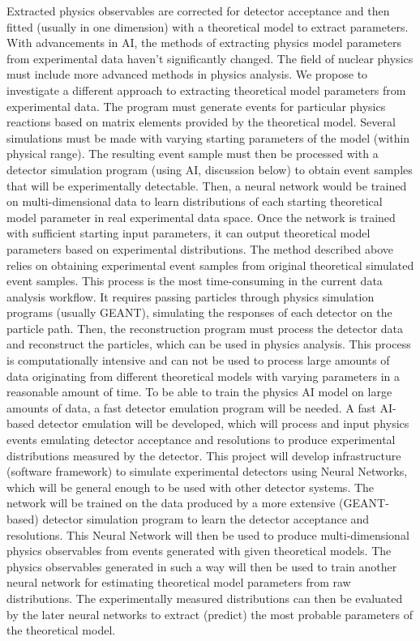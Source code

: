 Extracted physics observables are corrected for detector acceptance and then fitted (usually in one dimension) with a theoretical model to extract parameters. With advancements in AI, the methods of extracting physics model parameters from experimental data haven't significantly changed.
The field of nuclear physics must include more advanced methods in physics analysis. 
We propose to investigate a different approach to extracting theoretical model parameters from experimental data. 
The program must generate events for particular physics reactions based on matrix elements provided by the theoretical model. Several simulations must be made with varying starting parameters of the model (within physical range). The resulting event sample must then be processed with a detector simulation program (using AI, discussion below) to obtain event samples that will be experimentally detectable. Then, a neural network would be trained on multi-dimensional data to learn distributions of each starting theoretical model parameter in real experimental data space. Once the network is trained with sufficient starting input parameters, it can output theoretical model parameters based on experimental distributions.
The method described above relies on obtaining experimental event samples from original theoretical simulated event samples. This process is the most time-consuming in the current data analysis workflow. It requires passing particles through physics simulation programs (usually GEANT), simulating the responses of each detector on the particle path. Then, the reconstruction program must process the detector data and reconstruct the particles, which can be used in physics analysis. This process is computationally intensive and can not be used to process large amounts of data originating from different theoretical models with varying parameters in a reasonable amount of time. To be able to train the physics AI model on large amounts of data, a fast detector emulation program will be needed. 
A fast AI-based detector emulation will be developed, which will process and input physics events emulating detector acceptance and resolutions to produce experimental distributions measured by the detector.
This project will develop infrastructure (software framework) to simulate experimental detectors using Neural Networks, which will be general enough to be used with other detector systems. The network will be trained on the data produced by a more extensive (GEANT-based) detector simulation program to learn the detector acceptance and resolutions. This Neural Network will then be used to produce multi-dimensional physics observables from events generated with given theoretical models. The physics observables generated in such a way will then be used to train another neural network for estimating theoretical model parameters from raw distributions. The experimentally measured distributions can then be evaluated by the later neural networks to extract (predict) the most probable parameters of the theoretical model.

